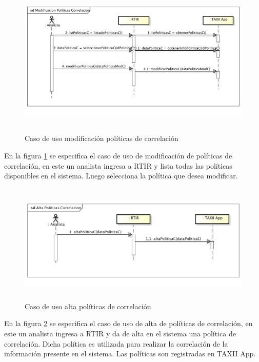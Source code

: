 \bigskip
\begin{figure}[ht!]
	\centering
	\includegraphics[width=5.7638in,height=2.9256in]{Analisis22-img/Analisis22-img021.png} 
	\caption{Caso de uso modificación políticas de correlación}
	\label{fig.modificacioncorrelacion}
\end{figure}
	En la figura \ref{fig.modificacioncorrelacion} se especifica el caso de uso de modificación de políticas de correlación, en este un analista ingresa a
	RTIR y lista todas las políticas disponibles en el sistema. Luego selecciona la política que desea modificar.


\bigskip
\begin{figure}[ht!]
	\centering
	\includegraphics[width=5.7638in,height=2.2535in]{Analisis22-img/Analisis22-img022.png} 
	\caption{Caso de uso alta políticas de correlación}
	\label{fig.altacorrelacion}
\end{figure}
	En la figura \ref{fig.altacorrelacion} se especifica el caso de uso de alta de políticas de correlación, en este un analista ingresa a RTIR y
	da de alta en el sistema una política de correlación. Dicha política es utilizada para realizar la correlación de la
	información presente en el sistema. Las políticas son registradas en TAXII App.


\newpage

